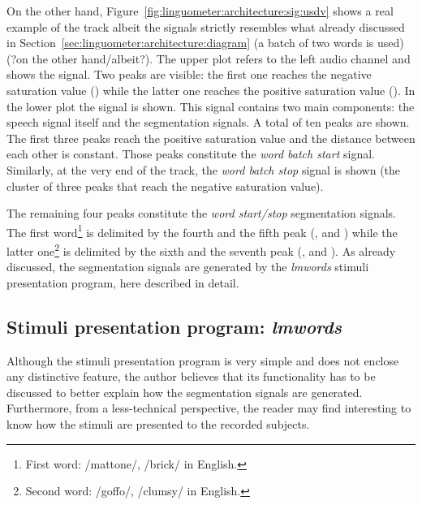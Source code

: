 On the other hand, Figure~\ref{fig:linguometer:architecture:sig:usdv} shows a 
real example of the  track albeit the signals strictly 
resembles what already
discussed in Section~\ref{sec:linguometer:architecture:diagram} (a batch of two words
is used) (?on the other hand/albeit?).
The upper plot refers to the left audio channel and shows the 
signal. Two peaks are visible: the first one reaches the negative saturation
value () while the latter one reaches the positive saturation value 
().
In the lower plot the  signal is shown. This signal contains two
  main components: the speech signal itself and the segmentation signals.
A total of ten peaks are shown.
The first three peaks reach the positive saturation value and the distance
between each other is constant. 
Those peaks constitute the \emph{word batch start} signal.
Similarly, at the very end of the track, the \emph{word batch stop} signal is
shown (the cluster of three peaks that reach the negative saturation value).

The remaining four peaks constitute the \emph{word start/stop} segmentation
signals.
The first word\footnote{First word: /mattone/, /brick/ in English.}
is delimited by the fourth and the fifth peak
(, and )
while the latter one\footnote{Second word: /goffo/, /clumsy/ in English.}
is delimited by the sixth and the seventh peak 
(, and ).
As already discussed, the segmentation signals are generated by the
\emph{lmwords} stimuli presentation program, here described in detail.
\subsection{Stimuli presentation program: \emph{lmwords}}
\label{sec:linguometer:technical:lmwords}
Although the stimuli presentation program is very simple and does not enclose
any distinctive feature, the author believes that its functionality has to be
discussed to better explain how the segmentation signals are generated. 
Furthermore, from a less-technical perspective, the reader may find interesting
to know how the stimuli are presented to the recorded subjects.

